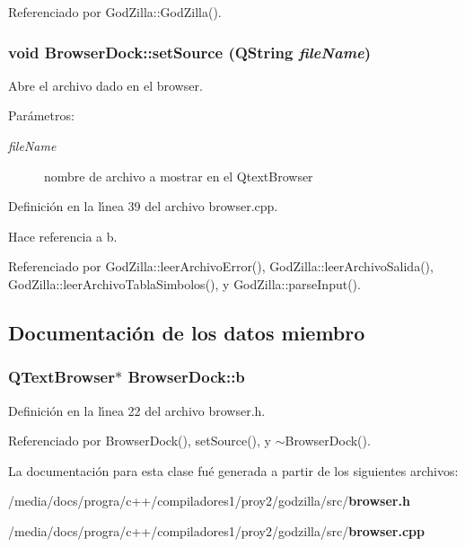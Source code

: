 Referenciado por God\-Zilla::God\-Zilla().
\subsubsection{\setlength{\rightskip}{0pt plus 5cm}void Browser\-Dock::set\-Source (QString {\em file\-Name})}\label{classBrowserDock_a3}


Abre el archivo dado en el browser. 

\begin{Desc}
\item[Par\'{a}metros:]
\begin{description}
\item[{\em file\-Name}]nombre de archivo a mostrar en el Qtext\-Browser \end{description}
\end{Desc}


Definici\'{o}n en la l\'{\i}nea 39 del archivo browser.cpp.

Hace referencia a b.

Referenciado por God\-Zilla::leer\-Archivo\-Error(), God\-Zilla::leer\-Archivo\-Salida(), God\-Zilla::leer\-Archivo\-Tabla\-Simbolos(), y God\-Zilla::parse\-Input().

\subsection{Documentaci\'{o}n de los datos miembro}
\subsubsection{\setlength{\rightskip}{0pt plus 5cm}QText\-Browser$\ast$ {\bf Browser\-Dock::b}\hspace{0.3cm}{\tt  [private]}}\label{classBrowserDock_r0}




Definici\'{o}n en la l\'{\i}nea 22 del archivo browser.h.

Referenciado por Browser\-Dock(), set\-Source(), y $\sim$Browser\-Dock().

La documentaci\'{o}n para esta clase fu\'{e} generada a partir de los siguientes archivos:\begin{CompactItemize}
\item 
/media/docs/progra/c++/compiladores1/proy2/godzilla/src/{\bf browser.h}\item 
/media/docs/progra/c++/compiladores1/proy2/godzilla/src/{\bf browser.cpp}\end{CompactItemize}
